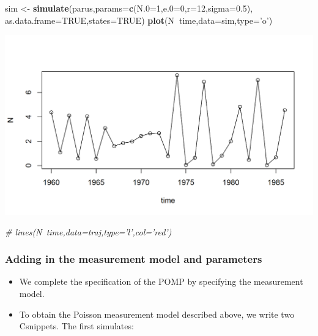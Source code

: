\documentclass[]{article}
\newenvironment{Shaded}{\begin{snugshade}}{\end{snugshade}}
\newcommand{\KeywordTok}[1]{\textcolor[rgb]{0.13,0.29,0.53}{\textbf{#1}}}
\newcommand{\DataTypeTok}[1]{\textcolor[rgb]{0.13,0.29,0.53}{#1}}
\newcommand{\DecValTok}[1]{\textcolor[rgb]{0.00,0.00,0.81}{#1}}
\newcommand{\FloatTok}[1]{\textcolor[rgb]{0.00,0.00,0.81}{#1}}
\newcommand{\StringTok}[1]{\textcolor[rgb]{0.31,0.60,0.02}{#1}}
\newcommand{\CommentTok}[1]{\textcolor[rgb]{0.56,0.35,0.01}{\textit{#1}}}
\newcommand{\OtherTok}[1]{\textcolor[rgb]{0.56,0.35,0.01}{#1}}
\newcommand{\OperatorTok}[1]{\textcolor[rgb]{0.81,0.36,0.00}{\textbf{#1}}}
\newcommand{\NormalTok}[1]{#1}
\begin{document}
\begin{Shaded}
\begin{Highlighting}[]
\NormalTok{sim <-}\StringTok{ }\KeywordTok{simulate}\NormalTok{(parus,}\DataTypeTok{params=}\KeywordTok{c}\NormalTok{(}\DataTypeTok{N.0=}\DecValTok{1}\NormalTok{,}\DataTypeTok{e.0=}\DecValTok{0}\NormalTok{,}\DataTypeTok{r=}\DecValTok{12}\NormalTok{,}\DataTypeTok{sigma=}\FloatTok{0.5}\NormalTok{),}
                \DataTypeTok{as.data.frame=}\OtherTok{TRUE}\NormalTok{,}\DataTypeTok{states=}\OtherTok{TRUE}\NormalTok{)}
\KeywordTok{plot}\NormalTok{(N}\OperatorTok{~}\NormalTok{time,}\DataTypeTok{data=}\NormalTok{sim,}\DataTypeTok{type=}\StringTok{'o'}\NormalTok{)}
\end{Highlighting}
\end{Shaded}

\begin{center}\includegraphics{figure/intro-ricker-first-sim-1} \end{center}

\begin{Shaded}
\begin{Highlighting}[]
\CommentTok{# lines(N~time,data=traj,type='l',col='red')}
\end{Highlighting}
\end{Shaded}

\subsubsection{Adding in the measurement model and
parameters}\label{adding-in-the-measurement-model-and-parameters}

\begin{itemize}
\item
  We complete the specification of the POMP by specifying the
  measurement model.
\item
  To obtain the Poisson measurement model described above, we write two
  Csnippets. The first simulates:
\end{itemize}
\end{document}
